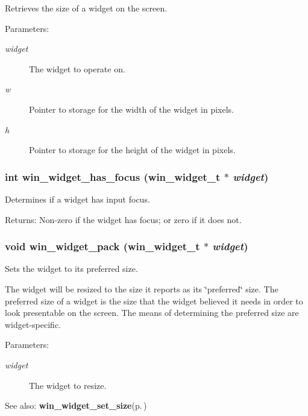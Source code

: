 Retrieves the size of a widget on the screen. 

\begin{Desc}
\item[Parameters:]
\begin{description}
\item[{\em widget}]The widget to operate on. \item[{\em w}]Pointer to storage for the width of the widget in pixels. \item[{\em h}]Pointer to storage for the height of the widget in pixels. \end{description}
\end{Desc}
\subsubsection{\setlength{\rightskip}{0pt plus 5cm}int win\_\-widget\_\-has\_\-focus ({\bf win\_\-widget\_\-t} $\ast$ {\em widget})}\label{winwidget_8h_a7}


Determines if a widget has input focus. 

\begin{Desc}
\item[Returns:]Non-zero if the widget has focus; or zero if it does not. \end{Desc}
\subsubsection{\setlength{\rightskip}{0pt plus 5cm}void win\_\-widget\_\-pack ({\bf win\_\-widget\_\-t} $\ast$ {\em widget})}\label{winwidget_8h_a12}


Sets the widget to its preferred size. 

The widget will be resized to the size it reports as its \char`\"{}preferred\char`\"{} size. The preferred size of a widget is the size that the widget believed it needs in order to look presentable on the screen. The means of determining the preferred size are widget-specific.

\begin{Desc}
\item[Parameters:]
\begin{description}
\item[{\em widget}]The widget to resize.\end{description}
\end{Desc}
\begin{Desc}
\item[See also:]{\bf win\_\-widget\_\-set\_\-size}{\rm (p.\,\pageref{winwidget_8h_a10})} \end{Desc}
